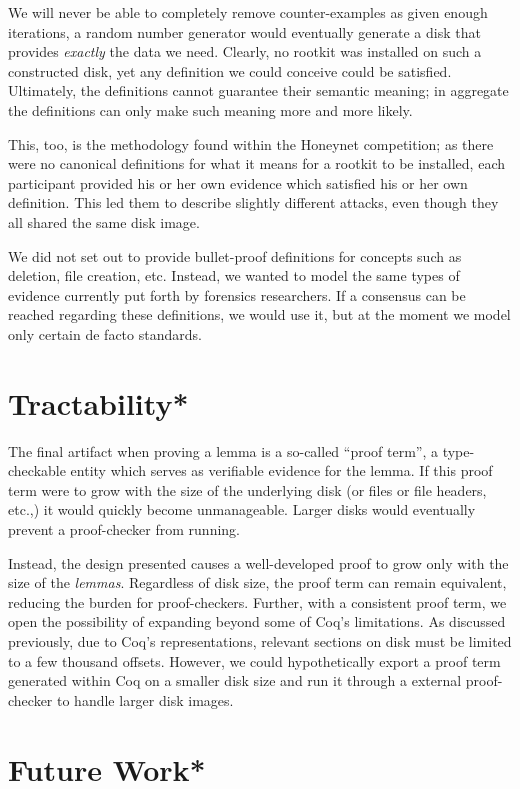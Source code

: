 \documentclass[nocopyrightspace]{sigplanconf}
\begin{document}
We will never be able to completely remove counter-examples as given enough
iterations, a random number generator would eventually generate a disk that
provides {\em exactly} the data we need. Clearly, no rootkit was installed on
such a constructed disk, yet any definition we could conceive could be
satisfied. Ultimately, the definitions cannot guarantee their semantic
meaning; in aggregate the definitions can only make such meaning more and more
likely.

This, too, is the methodology found within the Honeynet competition; as there
were no canonical definitions for what it means for a rootkit to be installed,
each participant provided his or her own evidence which satisfied his or her
own definition. This led them to describe slightly different attacks, even
though they all shared the same disk image.

We did not set out to provide bullet-proof definitions for concepts such as
deletion, file creation, etc. Instead, we wanted to model the same types of
evidence currently put forth by forensics researchers. If a consensus can be
reached regarding these definitions, we would use it, but at the moment we
model only certain de facto standards.

\section{Tractability*}
The final artifact when proving a lemma is a so-called ``proof term'', a
type-checkable entity which serves as verifiable evidence for the lemma. If
this proof term were to grow with the size of the underlying disk (or files or
file headers, etc.,) it would quickly become unmanageable. Larger disks would
eventually prevent a proof-checker from running.

Instead, the design presented causes a well-developed proof to grow only with
the size of the {\em lemmas}. Regardless of disk size, the proof term can
remain equivalent, reducing the burden for proof-checkers. Further, with a
consistent proof term, we open the possibility of expanding beyond some of
Coq's limitations. As discussed previously, due to Coq's representations,
relevant sections on disk must be limited to a few thousand offsets. However,
we could hypothetically export a proof term generated within Coq on a smaller
disk size and run it through a external proof-checker to handle larger disk
images.

\section{Future Work*}
\label{sec:future}
\end{document}
